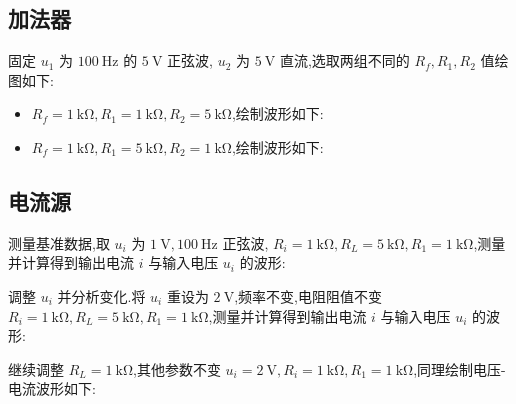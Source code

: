         \subsection{加法器}
        固定 $u_{1}$ 为 $100 \ \mathrm{Hz}$ 的 $5 \ \mathrm{V}$ 正弦波, $u_2$ 为 $5 \ \mathrm{V}$ 直流,选取两组不同的 $R_{f},R_1,R_2$ 值绘图如下:
        \begin{itemize}
            \item $R_{f}=1 \ \mathrm{k\Omega},R_1=1 \ \mathrm{k\Omega},R_2=5 \ \mathrm{k\Omega}$,绘制波形如下:
                \begin{figure}[htbp]
                    \centering
                \end{figure}
            \item $R_{f}=1 \ \mathrm{k\Omega},R_1=5 \ \mathrm{k\Omega},R_2=1 \ \mathrm{k\Omega}$,绘制波形如下:
                \begin{figure}[htbp]
                    \centering
                \end{figure}

        \end{itemize}
        \subsection{电流源}
        测量基准数据,取 $u_{i}$ 为 $1 \ \mathrm{V},100 \ \mathrm{Hz}$ 正弦波, $R_{i}=1 \ \mathrm{k\Omega},R_{L}=5 \ \mathrm{k\Omega},R_{1}=1 \ \mathrm{k\Omega}$,测量并计算得到输出电流 $i$ 与输入电压 $u_{i}$ 的波形:
        \begin{figure}[htbp]
            \centering
        \end{figure}

        调整 $u_{i}$ 并分析变化.将 $u_{i}$ 重设为 $2 \ \mathrm{V}$,频率不变,电阻阻值不变 $R_{i}=1 \ \mathrm{k\Omega},R_{L}=5 \ \mathrm{k\Omega},R_{1}=1 \ \mathrm{k\Omega}$,测量并计算得到输出电流 $i$ 与输入电压 $u_{i}$ 的波形:
        \newpage
        \begin{figure}[htbp]
            \centering
        \end{figure}

        继续调整 $R_{L}=1 \ \mathrm{k\Omega}$,其他参数不变 $u_{i}=2 \ \mathrm{V},R_{i}=1 \ \mathrm{k\Omega},R_1=1 \ \mathrm{k\Omega}$,同理绘制电压-电流波形如下:
        \begin{figure}[htbp]
            \centering
        \end{figure}

